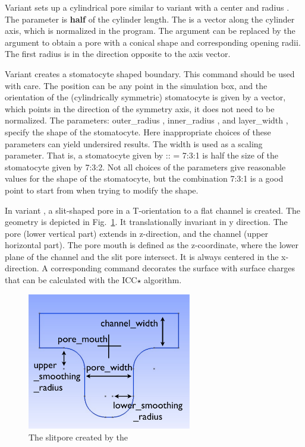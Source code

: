 Variant  sets up a cylindrical pore similar to variant
 with a center    and radius
. The  parameter is \textbf{half} of the cylinder
length. The  is a vector along the cylinder axis, which is
normalized in the program. The argument  
can be replaced by the argument 
to obtain a pore with a conical shape and corresponding opening radii.
The first radius is in the direction opposite to the axis vector.

Variant  creates a stomatocyte shaped boundary. This command
should be used with care. The position can be any point in the simulation
box, and the orientation of the (cylindrically symmetric) stomatocyte is
given by a vector, which points in the direction of the symmetry axis, it
does not need to be normalized. The parameters: outer_radius ,
inner_radius , and layer_width , specify the shape of the
stomatocyte. Here inappropriate choices of these parameters can yield 
undersired results. The width is used as a scaling parameter. That is,
a stomatocyte given by :: = 7:3:1 is half the size
of the stomatocyte given by 7:3:2. Not all choices of the parameters give
reasonable values for the shape of the stomatocyte, but the combination
7:3:1 is a good point to start from when trying to modify the shape. 

In variant , a slit-shaped pore in a T-orientation to a flat channel
is created. 
The geometry is depicted in Fig.~\ref{fig:slitpore}.
It translationally invariant in y direction.
The pore (lower vertical part) extends in z-direction, and the channel (upper
horizontal part). The pore mouth is defined as the z-coordinate, where the lower
plane of the channel and the slit pore intersect. It is always centered in the
x-direction. A corresponding  command decorates the surface
with surface charges that can be calculated with the ICC$\star$ algorithm.
\begin{figure}[ht]
  \label{fig:slitpore}
  \begin{center}
  \includegraphics[height=6cm]{figures/slitpore.pdf}
  \caption{The slitpore created by the }
  \end{center}
\end{figure}

